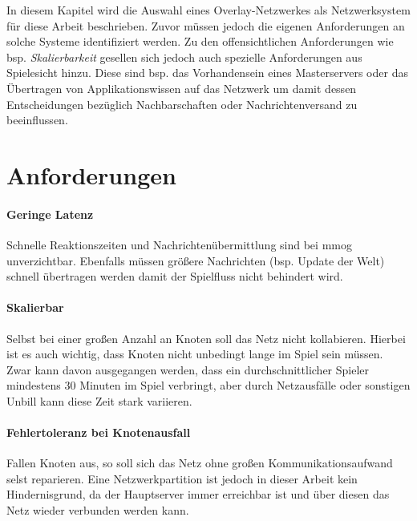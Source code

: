 In diesem Kapitel wird die Auswahl eines Overlay-Netzwerkes als Netzwerksystem für diese Arbeit beschrieben. Zuvor müssen jedoch die eigenen Anforderungen an solche Systeme identifiziert werden. Zu den offensichtlichen Anforderungen wie bsp. \emph{Skalierbarkeit} gesellen sich jedoch auch spezielle Anforderungen aus Spielesicht hinzu. Diese sind bsp. das Vorhandensein eines Masterservers oder das Übertragen von Applikationswissen auf das Netzwerk um damit dessen Entscheidungen bezüglich Nachbarschaften oder Nachrichtenversand zu beeinflussen.



\cite{Castro2002Secure} %

\cite{Steinmetz2005,Wehrle2005,Goetz2005}

\section{Anforderungen}

\cite{Darlagiannis2006Peertopeer} %

\paragraph{Geringe Latenz} Schnelle Reaktionszeiten und Nachrichtenübermittlung sind bei \ac{mmog} unverzichtbar. Ebenfalls müssen größere Nachrichten (bsp. Update der Welt) schnell übertragen werden damit der Spielfluss nicht behindert wird.

\paragraph{Skalierbar} Selbst bei einer großen Anzahl an Knoten soll das Netz nicht kollabieren. Hierbei ist es auch wichtig, dass Knoten nicht unbedingt lange im Spiel sein müssen. Zwar kann davon ausgegangen werden, dass ein durchschnittlicher Spieler mindestens 30 Minuten im Spiel verbringt, aber durch Netzausfälle oder sonstigen Unbill kann diese Zeit stark variieren.


\paragraph{Fehlertoleranz bei Knotenausfall} Fallen Knoten aus, so soll sich das Netz ohne großen Kommunikationsaufwand selst reparieren. Eine Netzwerkpartition ist jedoch in dieser Arbeit kein Hindernisgrund, da der Hauptserver immer erreichbar ist und über diesen das Netz wieder verbunden werden kann.

